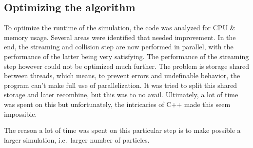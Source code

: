 \documentclass[
]{article}
\begin{document}
\hypertarget{optimizing-the-algorithm}{%
\subsection{Optimizing the algorithm}\label{optimizing-the-algorithm}}

To optimize the runtime of the simulation, the code was analyzed for CPU
\& memory usage. Several areas were identified that needed improvement.
In the end, the streaming and collision step are now performed in
parallel, with the performance of the latter being very satisfying. The
performance of the streaming step however could not be optimized much
further. The problem is storage shared between threads, which means, to
prevent errors and undefinable behavior, the program can't make full use
of parallelization. It was tried to split this shared storage and later
recombine, but this was to no avail. Ultimately, a lot of time was spent
on this but unfortunately, the intricacies of C++ made this seem
impossible.

The reason a lot of time was spent on this particular step is to make
possible a larger simulation, i.e.~larger number of particles.
\end{document}

